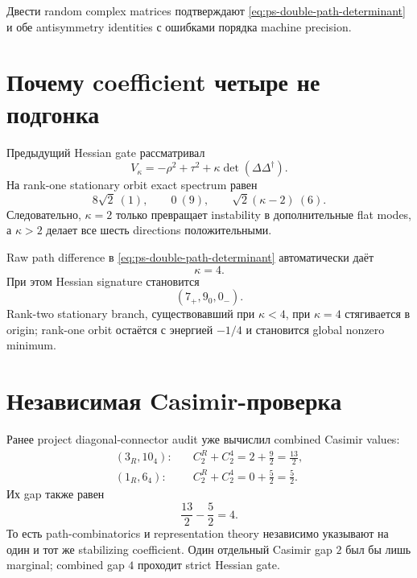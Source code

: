 Двести random complex matrices подтверждают
\eqref{eq:ps-double-path-determinant} и обе antisymmetry identities с
ошибками порядка machine precision.

\section{Почему coefficient четыре не подгонка}

Предыдущий Hessian gate рассматривал
\begin{equation}
 V_\kappa=-\rho^2+\tau^2
 +\kappa\det(\Delta\Delta^\dagger).
\end{equation}
На rank-one stationary orbit exact spectrum равен
\begin{equation}
 8\sqrt2\ (1),\qquad
 0\ (9),\qquad
 \sqrt2(\kappa-2)\ (6).
 \label{eq:ps-kappa-hessian}
\end{equation}
Следовательно, \(\kappa=2\) только превращает instability в дополнительные
flat modes, а \(\kappa>2\) делает все шесть directions положительными.

Raw path difference в
\eqref{eq:ps-double-path-determinant} автоматически даёт
\begin{equation}
 \boxed{\kappa=4.}
\end{equation}
При этом Hessian signature становится
\begin{equation}
 \boxed{(7_+,9_0,0_-)}.
\end{equation}
Rank-two stationary branch, существовавший при \(\kappa<4\), при
\(\kappa=4\) стягивается в origin; rank-one orbit остаётся с энергией
\(-1/4\) и становится global nonzero minimum.

\section{Независимая Casimir-проверка}

Ранее project diagonal-connector audit уже вычислил combined Casimir values:
\begin{align}
 (3_R,10_4):&\quad C_2^R+C_2^4=2+\frac92=\frac{13}{2},\\
 (1_R,6_4):&\quad C_2^R+C_2^4=0+\frac52=\frac52.
\end{align}
Их gap также равен
\begin{equation}
 \frac{13}{2}-\frac52=4.
\end{equation}
То есть path-combinatorics и representation theory независимо указывают на
один и тот же stabilizing coefficient. Один отдельный Casimir gap \(2\)
был бы лишь marginal; combined gap \(4\) проходит strict Hessian gate.

